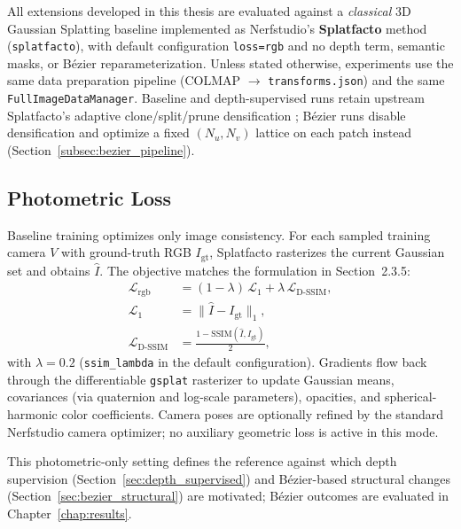 \documentclass{report}
\newcommand{\filepath}[1]{\nolinkurl{#1}}
\newcommand{\code}[1]{\nolinkurl{#1}}
\begin{document}
All extensions developed in this thesis are evaluated against a \emph{classical} 3D Gaussian Splatting baseline implemented as Nerfstudio's \textbf{Splatfacto} method (\texttt{splatfacto}), with default configuration \texttt{loss=rgb} and no depth term, semantic masks, or B\'ezier reparameterization. Unless stated otherwise, experiments use the same data preparation pipeline (COLMAP $\rightarrow$ \filepath{transforms.json}) and the same \texttt{FullImageDataManager}. Baseline and depth-supervised runs retain upstream Splatfacto's adaptive clone/split/prune densification \cite{kerbl2023gaussian,tancik2023nerfstudio}; B\'ezier runs disable densification and optimize a fixed $(N_u,N_v)$ lattice on each patch instead (Section~\ref{subsec:bezier_pipeline}).

\subsection{Photometric Loss}
\label{subsec:baseline_photometric}

Baseline training optimizes only image consistency. For each sampled training camera $V$ with ground-truth RGB $I_{\mathrm{gt}}$, Splatfacto rasterizes the current Gaussian set and obtains $\hat{I}$. The objective matches the formulation in Section~2.3.5:
\begin{align}
\mathcal{L}_{\mathrm{rgb}} &= (1-\lambda)\,\mathcal{L}_{1}+\lambda\,\mathcal{L}_{\text{D-SSIM}}, \\
\mathcal{L}_{1} &= \|\hat{I}-I_{\mathrm{gt}}\|_{1}, \\
\mathcal{L}_{\text{D-SSIM}} &= \frac{1-\mathrm{SSIM}(\hat{I},I_{\mathrm{gt}})}{2},
\label{eq:baseline_photometric}
\end{align}
with $\lambda=0.2$ (\code{ssim\_lambda} in the default configuration). Gradients flow back through the differentiable \code{gsplat} rasterizer to update Gaussian means, covariances (via quaternion and log-scale parameters), opacities, and spherical-harmonic color coefficients. Camera poses are optionally refined by the standard Nerfstudio camera optimizer; no auxiliary geometric loss is active in this mode.

This photometric-only setting defines the reference against which depth supervision (Section~\ref{sec:depth_supervised}) and B\'ezier-based structural changes (Section~\ref{sec:bezier_structural}) are motivated; B\'ezier outcomes are evaluated in Chapter~\ref{chap:results}.
\end{document}
